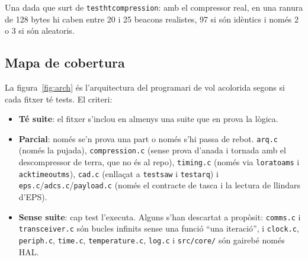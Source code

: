 \documentclass[11pt,a4paper]{article}
\DeclareRobustCommand{\_}{\textunderscore\allowbreak}
\newcommand{\cd}[1]{\texttt{#1}}
\begin{document}
Una dada que surt de \cd{test\_ht\_compression}: amb el compressor real, en una ranura de
128 bytes hi caben entre 20 i 25 beacons realistes, 97 si són idèntics i només 2 o 3 si són
aleatoris.

\subsection{Mapa de cobertura}

La figura~\ref{fig:arch} és l'arquitectura del programari de vol acolorida segons si cada
fitxer té tests. El criteri:
\begin{itemize}
\item \textbf{Té suite}: el fitxer s'inclou en almenys una suite que en prova la lògica.
\item \textbf{Parcial}: només se'n prova una part o només s'hi passa de rebot.
  \cd{arq.c} (només la pujada), \cd{compression.c} (sense prova d'anada i tornada amb el
  descompressor de terra, que no és al repo), \cd{timing.c} (només via \cd{lora\_toa\_ms} i
  \cd{ack\_timeout\_ms}), \cd{cad.c} (enllaçat a \cd{test\_saw} i \cd{test\_arq}) i
  \cd{eps.c}/\cd{adcs.c}/\cd{payload.c} (només el contracte de tasca i la lectura de llindars d'EPS).
\item \textbf{Sense suite}: cap test l'executa. Alguns s'han descartat a propòsit:
  \cd{comms.c} i \cd{transceiver.c} són bucles infinits sense una funció ``una iteració'', i
  \cd{clock.c}, \cd{periph.c}, \cd{time.c}, \cd{temperature.c}, \cd{log.c} i \cd{src/core/} són
  gairebé només HAL.
\end{itemize}
\end{document}
